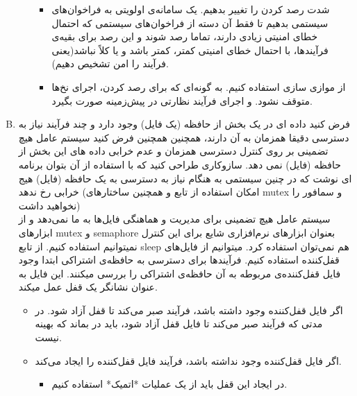 \documentclass[]{article}
\begin{document}
\begin{enumerate}[(A)]
\begin{enumerate}[i.]
\begin{itemize}
                              \item شدت رصد کردن را تغییر بدهیم. یک سامانه‌ی اولویتی به فراخوان‌های سیستمی بدهیم تا فقط آن دسته از فراخوان‌های سیستمی که احتمال خطای امنیتی زیادی دارند،
                                    تماما رصد شوند و این رصد برای بقیه‌ی فرآیند‌ها، با احتمال خطای امنیتی کمتر، کمتر باشد و یا کلاً نباشد(یعنی فرآیند را امن تشخیص دهیم).
                              \item از موازی سازی استفاده کنیم. به گونه‌ای که برای رصد کردن، اجرای نخ‌ها متوقف نشود. و اجرای فرآیند نظارتی در پیش‌زمینه صورت بگیرد.
                        \end{itemize}
            \end{enumerate}
      \item  ﻓﺮﺽ ﮐﻨﯿﺪ ﺩﺍﺩﻩ ﺍﯼ ﺩﺭ ﯾﮏ ﺑﺨﺶ ﺍﺯ ﺣﺎﻓﻈﻪ
            (ﯾﮏ ﻓﺎﯾﻞ)
            ﻭﺟﻮﺩ ﺩﺍﺭﺩ ﻭ ﭼﻨﺪ ﻓﺮﺁﯾﻨﺪ ﻧﯿﺎﺯ ﺑﻪ ﺩﺳﺘﺮﺳﯽ ﺩﻗﯿﻘﺎ ﻫﻤﺰﻣﺎﻥ ﺑﻪ ﺁﻥ ﺩﺍﺭﻧﺪ، ﻫﻤﭽﻨﯿﻦ
            ﻫﻤﭽﻨﯿﻦ ﻓﺮﺽ ﮐﻨﯿﺪ ﺳﯿﺴﺘﻢ ﻋﺎﻣﻞ ﻫﯿﭻ ﺗﻀﻤﯿﻨﯽ ﺑﺮ ﺭﻭﯼ ﮐﻨﺘﺮﻝ ﺩﺳﺘﺮﺳﯽ ﻫﻤﺰﻣﺎﻥ ﻭ ﻋﺪﻡ ﺧﺮﺍﺑﯽ ﺩﺍﺩﻩ ﻫﺎﯼ ﺍﯾﻦ ﺑﺨﺶ ﺍﺯ ﺣﺎﻓﻈﻪ
            (فایل)
            ﻧﻤﯽ ﺩﻫﺪ.
            ﺳﺎﺯﻭﮐﺎﺭﯼ ﻃﺮﺍﺣﯽ ﮐﻨﯿﺪ ﮐﻪ ﺑﺎ ﺍﺳﺘﻔﺎﺩﻩ ﺍﺯ ﺁﻥ ﺑﺘﻮﺍﻥ ﺑﺮﻧﺎﻣﻪ ﺍﯼ ﻧﻮﺷﺖ ﮐﻪ ﺩﺭ ﭼﻨﯿﻦ ﺳﯿﺴﺘﻤﯽ ﺑﻪ ﻫﻨﮕﺎﻡ ﻧﯿﺎﺯ ﺑﻪ ﺩﺳﺘﺮﺳﯽ ﺑﻪ ﯾﮏ ﺣﺎﻓﻈﻪ
            (فایل)
            ﻫﯿﺞ ﺧﺮﺍﺑﯽ ﺭﺥ ﻧﺪﻫﺪ
            (ﺍﻣﮑﺎﻥ ﺍﺳﺘﻔﺎﺩﻩ ﺍﺯ ﺗﺎﺑﻊ  ﻭ ﻫﻤﭽﻨﯿﻦ ﺳﺎﺧﺘﺎﺭﻫﺎﯼ mutex ﻭ ﺳﻤﺎﻓﻮﺭ ﺭﺍ ﻧﺨﻮﺍﻫﯿﺪ ﺩﺍﺷﺖ)
            \\
            سیستم عامل هیچ تضمینی برای مدیریت و هماهنگی فایل‌ها به ما نمی‌دهد و از ابزار‌های mutex و semaphore  بعنوان ابزار‌های نرم‌افزاری شایع برای این کنترل نمیتوانیم استفاده کنیم. از تابع sleep هم نمی‌توان استفاده کرد.
            میتوانیم از فایل‌های قفل‌کننده
            استفاده کنیم. فرآیند‌ها برای دسترسی به حافظه‌ی اشتراکی ابتدا وجود فایل قفل‌کننده‌ی مربوطه به آن حافظه‌ی اشتراکی را بررسی میکنند. این فایل به عنوان نشانگر یک قفل عمل میکند.
            \begin{itemize}
                  \renewcommand\labelitemi{-}
                  \item اگر فایل قفل‌کننده وجود داشته باشد، فرآیند صبر می‌کند تا قفل آزاد شود.
                        در مدتی که فرآیند صبر می‌کند تا فایل قفل آزاد شود، باید در
                        بماند که بهینه نیست.
                  \item  اگر فایل قفل‌کننده وجود نداشته باشد، فرآیند فایل قفل‌کننده را ایجاد می‌کند.
                        \begin{itemize}
                              \item  در ایجاد این قفل باید از یک عملیات *اتمیک* استفاده کنیم.

\end{itemize}
\end{itemize}
\end{enumerate}
\end{document}
